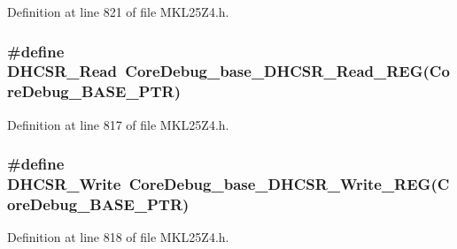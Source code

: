 Definition at line 821 of file M\+K\+L25\+Z4.\+h.

\subsubsection[{\texorpdfstring{D\+H\+C\+S\+R\+\_\+\+Read}{DHCSR_Read}}]{\setlength{\rightskip}{0pt plus 5cm}\#define D\+H\+C\+S\+R\+\_\+\+Read~{\bf Core\+Debug\+\_\+base\+\_\+\+D\+H\+C\+S\+R\+\_\+\+Read\+\_\+\+R\+EG}({\bf Core\+Debug\+\_\+\+B\+A\+S\+E\+\_\+\+P\+TR})}\hypertarget{group___core_debug___register___accessor___macros_ga7d77eafe76b2000c7159e58e11ade9a1}{}\label{group___core_debug___register___accessor___macros_ga7d77eafe76b2000c7159e58e11ade9a1}


Definition at line 817 of file M\+K\+L25\+Z4.\+h.

\subsubsection[{\texorpdfstring{D\+H\+C\+S\+R\+\_\+\+Write}{DHCSR_Write}}]{\setlength{\rightskip}{0pt plus 5cm}\#define D\+H\+C\+S\+R\+\_\+\+Write~{\bf Core\+Debug\+\_\+base\+\_\+\+D\+H\+C\+S\+R\+\_\+\+Write\+\_\+\+R\+EG}({\bf Core\+Debug\+\_\+\+B\+A\+S\+E\+\_\+\+P\+TR})}\hypertarget{group___core_debug___register___accessor___macros_ga3c374ff0f88587d03fd707ebc0a06169}{}\label{group___core_debug___register___accessor___macros_ga3c374ff0f88587d03fd707ebc0a06169}


Definition at line 818 of file M\+K\+L25\+Z4.\+h.

